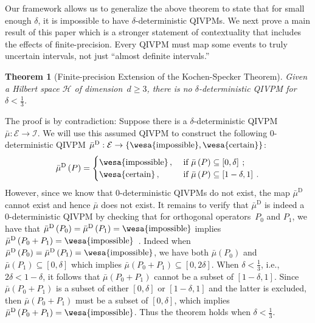 \documentclass[english,reprint, aps, prl,superscriptaddress, showpacs,
showkeys, longbibliography, amsmath, amssymb, floatfix]{revtex4-1}
\theoremstyle{plain}
\newtheorem{thm}{Theorem}
\theoremstyle{definition}
\newcommand{\Hilb}{\mathcal{H}}
\newcommand{\events}{\ensuremath{\mathcal{E}}}
\newcommand{\imposs}{{\text{\wesa{impossible}}}}
\newcommand{\necess}{{\text{\wesa{certain}}}}
\begin{document}
Our framework allows us to generalize the above theorem to state that
for small enough $\delta$, it is impossible to have
$\delta$-deterministic QIVPMs. We next prove a main result of this
paper which is a stronger statement of contextuality that includes the
effects of finite-precision.  Every QIVPM must map some events to
truly uncertain intervals, not just ``almost definite intervals.'' 

\begin{thm}[Finite-precision Extension of the Kochen-Specker
  Theorem] \label{cor:Kochen-Specker-IVPM} Given a Hilbert space
  $\Hilb$ of dimension~$d\ge3$, there is no $\delta$-deterministic
  QIVPM for $\delta<\frac{1}{3}$.\end{thm}

The proof is by contradiction: Suppose there is a
$\delta$-deterministic
QIVPM~$\bar{\mu}:\events\rightarrow\mathscr{I}$. We will use this
assumed QIVPM to construct the following 0-deterministic QIVPM
$\bar{\mu}^{\textrm{D}}:\events\rightarrow\left\{
  \imposs,\necess\right\}$:
\[
\bar{\mu}^{\textrm{D}}\left(P\right)=\begin{cases}
\imposs\,, & \textrm{ if }\bar{\mu}\left(P\right)\subseteq\left[0,\delta\right]\:;\\
\necess\,, & \textrm{ if }\bar{\mu}\left(P\right)\subseteq\left[1-\delta,1\right]\:.
\end{cases}
\]
However, since we know that 0-deterministic QIVPMs do not exist, the
map $\bar{\mu}^{\textrm{D}}$ cannot exist and hence $\bar{\mu}$ does
not exist. It remains to verify that $\bar{\mu}^{\textrm{D}}$ is
indeed a 0-deterministic QIVPM by checking that for orthogonal
operators~$P_{0}$ and $P_{1}$, we have that
$\bar{\mu}^{\textrm{D}}\left(P_{0}\right)=\bar{\mu}^{\textrm{D}}\left(P_{1}\right)=\imposs$
implies
$\bar{\mu}^{\textrm{D}}\left(P_{0}+P_{1}\right)=\imposs$~\citep{HOSTunpublished}. Indeed
when
$\bar{\mu}^{\textrm{D}}\left(P_{0}\right)=\bar{\mu}^{\textrm{D}}\left(P_{1}\right)=\imposs$,
we have both $\bar{\mu}\left(P_{0}\right)$ and
$\bar{\mu}\left(P_{1}\right)\subseteq\left[0,\delta\right]$ which
implies
$\bar{\mu}\left(P_{0}+P_{1}\right)\subseteq\left[0,2\delta\right]$.
When $\delta<\frac{1}{3}$, i.e., $2\delta<1-\delta$, it follows that
$\bar{\mu}\left(P_{0}+P_{1}\right)$ cannot be a subset of
$\left[1-\delta,1\right]$. Since $\bar{\mu}\left(P_{0}+P_{1}\right)$
is a subset of either $\left[0,\delta\right]$ or
$\left[1-\delta,1\right]$ and the latter is excluded, then
$\bar{\mu}\left(P_{0}+P_{1}\right)$ must be a subset of
$\left[0,\delta\right]$, which implies
$\bar{\mu}^{\textrm{D}}\left(P_{0}+P_{1}\right)=\imposs$. Thus the
theorem holds when $\delta<\frac{1}{3}$.
\end{document}
